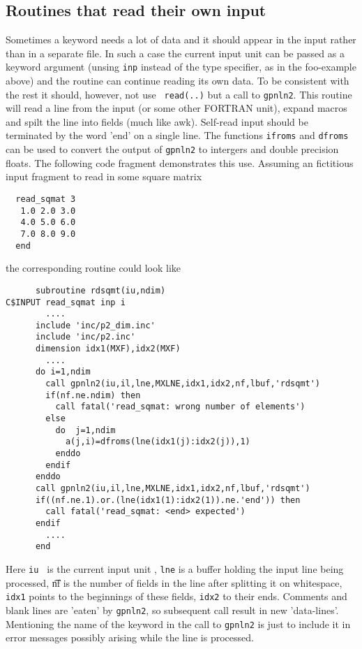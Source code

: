 \documentclass[a4paper]{article}
\begin{document}
\subsection{Routines that read their own input}
Sometimes a keyword needs a lot of data and it should appear in the input
rather than in a separate file. In such a case the current input unit can be
passed as a keyword argument (unsing {\tt inp} instead of the type specifier,
as in the foo-example above) and the routine can continue reading its own
data. To be consistent with the rest it should, however, not use {\tt
read(..)} but a call to {\tt gpnln2}. This routine will read a line from the
input (or some other FORTRAN unit), expand macros and spilt the line into
fields (much like awk).  Self-read input should be terminated by the word
'end' on a single line. The functions {\tt ifroms} and {\tt dfroms} can be
used to convert the output of  {\tt gpnln2} to intergers and double precision floats.
The following code fragment demonstrates this use. 
Assuming  an fictitious input fragment to read in some square matrix
\begin{verbatim}
  read_sqmat 3
   1.0 2.0 3.0 
   4.0 5.0 6.0
   7.0 8.0 9.0
  end
\end{verbatim}  
the corresponding routine could look like
\begin{verbatim}
      subroutine rdsqmt(iu,ndim)
C$INPUT read_sqmat inp i
        ....
      include 'inc/p2_dim.inc'
      include 'inc/p2.inc'
      dimension idx1(MXF),idx2(MXF)
        ....
      do i=1,ndim
        call gpnln2(iu,il,lne,MXLNE,idx1,idx2,nf,lbuf,'rdsqmt')
        if(nf.ne.ndim) then
          call fatal('read_sqmat: wrong number of elements')
        else
          do  j=1,ndim
            a(j,i)=dfroms(lne(idx1(j):idx2(j)),1)
          enddo
        endif
      enddo
      call gpnln2(iu,il,lne,MXLNE,idx1,idx2,nf,lbuf,'rdsqmt')
      if((nf.ne.1).or.(lne(idx1(1):idx2(1)).ne.'end')) then
        call fatal('read_sqmat: <end> expected')
      endif
        ....
      end
\end{verbatim}
Here {\tt iu } is the current input unit , {\tt lne} is a buffer holding 
the input line being processed, {\t nf}  is the number of fields in the line
after splitting it on whitespace, {\tt idx1} points to the beginnings of these 
fields, {\tt idx2} to their ends. Comments and blank lines are 'eaten' by
{\tt gpnln2}, so subsequent call result in new 'data-lines'. 
Mentioning the name of the keyword in the call to {\tt gpnln2} is just to
include it in error messages possibly arising while the line is processed. 
\end{document}
